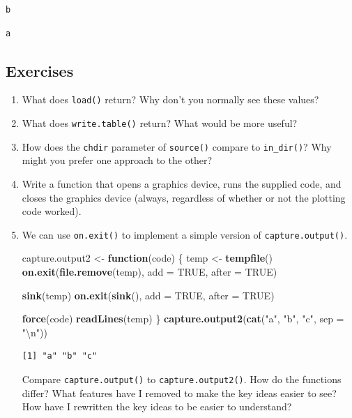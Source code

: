\documentclass[]{book}
\newenvironment{Shaded}{\begin{snugshade}}{\end{snugshade}}
\newcommand{\CharTok}[1]{\textcolor[rgb]{0.31,0.60,0.02}{#1}}
\newcommand{\ControlFlowTok}[1]{\textcolor[rgb]{0.13,0.29,0.53}{\textbf{#1}}}
\newcommand{\DataTypeTok}[1]{\textcolor[rgb]{0.13,0.29,0.53}{#1}}
\newcommand{\KeywordTok}[1]{\textcolor[rgb]{0.13,0.29,0.53}{\textbf{#1}}}
\newcommand{\NormalTok}[1]{#1}
\newcommand{\OtherTok}[1]{\textcolor[rgb]{0.56,0.35,0.01}{#1}}
\newcommand{\StringTok}[1]{\textcolor[rgb]{0.31,0.60,0.02}{#1}}
\theoremstyle{definition}
\theoremstyle{definition}
\theoremstyle{definition}
\theoremstyle{remark}
\begin{document}
\begin{verbatim}
b
\end{verbatim}

\begin{verbatim}
a
\end{verbatim}

\hypertarget{exercises-4}{%
\subsection{Exercises}\label{exercises-4}}

\begin{enumerate}
\def\labelenumi{\arabic{enumi}.}
\item
  What does \texttt{load()} return? Why don't you normally see these
  values?
\item
  What does \texttt{write.table()} return? What would be more useful?
\item
  How does the \texttt{chdir} parameter of \texttt{source()} compare to
  \texttt{in\_dir()}? Why might you prefer one approach to the other?
\item
  Write a function that opens a graphics device, runs the supplied code,
  and closes the graphics device (always, regardless of whether or not
  the plotting code worked).
\item
  We can use \texttt{on.exit()} to implement a simple version of
  \texttt{capture.output()}.

\begin{Shaded}
\begin{Highlighting}[]
\NormalTok{capture.output2 <-}\StringTok{ }\ControlFlowTok{function}\NormalTok{(code) \{}
\NormalTok{  temp <-}\StringTok{ }\KeywordTok{tempfile}\NormalTok{()}
  \KeywordTok{on.exit}\NormalTok{(}\KeywordTok{file.remove}\NormalTok{(temp), }\DataTypeTok{add =} \OtherTok{TRUE}\NormalTok{, }\DataTypeTok{after =} \OtherTok{TRUE}\NormalTok{)}

  \KeywordTok{sink}\NormalTok{(temp)}
  \KeywordTok{on.exit}\NormalTok{(}\KeywordTok{sink}\NormalTok{(), }\DataTypeTok{add =} \OtherTok{TRUE}\NormalTok{, }\DataTypeTok{after =} \OtherTok{TRUE}\NormalTok{)}

  \KeywordTok{force}\NormalTok{(code)}
  \KeywordTok{readLines}\NormalTok{(temp)}
\NormalTok{\}}
\KeywordTok{capture.output2}\NormalTok{(}\KeywordTok{cat}\NormalTok{(}\StringTok{"a"}\NormalTok{, }\StringTok{"b"}\NormalTok{, }\StringTok{"c"}\NormalTok{, }\DataTypeTok{sep =} \StringTok{"}\CharTok{\textbackslash{}n}\StringTok{"}\NormalTok{))}
\end{Highlighting}
\end{Shaded}

\begin{verbatim}
[1] "a" "b" "c"
\end{verbatim}

  Compare \texttt{capture.output()} to \texttt{capture.output2()}. How
  do the functions differ? What features have I removed to make the key
  ideas easier to see? How have I rewritten the key ideas to be easier
  to understand?
\end{enumerate}
\end{document}
